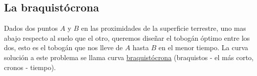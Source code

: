 \begin{subappendices}

\section{La braquistócrona}


\begin{mdframed}[style=MiEstilo]\relax%
 Dados dos puntos $A$ y $B$ en las proximidades de la superficie terrestre, uno mas abajo respecto al suelo que el otro,
queremos diseñar el tobogán óptimo entre los dos,
esto es el tobogán que nos lleve de $A$ hasta $B$ en el menor tiempo. La curva solución a este problema se llama curva
\href{http://es.wikipedia.org/wiki/Curva_braquistócrona}{braquistócrona} (braquistos - el más corto, cronos - tiempo).
\end{mdframed}


\begin{center}
\end{center}



\end{subappendices}
